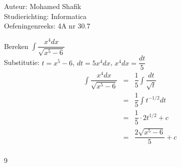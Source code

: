 \documentclass[a4paper]{article}
\begin{document}
\noindent \large Auteur: Mohamed Shafik \\
\noindent \large Studierichting: Informatica\\
\noindent \large Oefeningenreeks: 4A nr 30.7\\

\medskip

\normalsize

Bereken $\displaystyle\int \dfrac{x^4 dx}{\sqrt{x^5-6}}$\\

Substitutie: $t = x^5 - 6$, $dt = 5x^4 dx$, $x^4 dx = \dfrac{dt}{5}$\\

\begin{eqnarray*}
\displaystyle\int \dfrac{x^4 dx}{\sqrt{x^5-6}} &=& \dfrac{1}{5} \displaystyle\int \dfrac{dt}{\sqrt{t}}\\
&=& \dfrac{1}{5} \displaystyle\int t^{-1/2} dt\\
&=& \dfrac{1}{5} \cdot 2t^{1/2} + c\\
&=& \dfrac{2\sqrt{x^5-6}}{5} + c\\
\end{eqnarray*}

\begin{thebibliography}{9}
\end{thebibliography}
\end{document}
